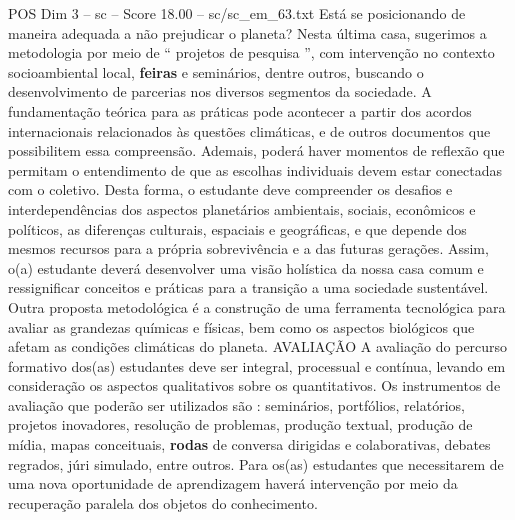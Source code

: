 \begin{textsample}{POS Dim 3 – sc – Score 18.00 – sc/sc\_em\_63.txt}
Está se posicionando de maneira adequada a não prejudicar o planeta?
Nesta última casa, sugerimos a metodologia por meio de “ projetos de pesquisa ”, com intervenção no contexto socioambiental local, \textbf{feiras} e seminários, dentre outros, buscando o desenvolvimento de parcerias nos diversos segmentos da sociedade.
A fundamentação teórica para as práticas pode acontecer a partir dos acordos internacionais relacionados às questões climáticas, e de outros documentos que possibilitem essa compreensão.
Ademais, poderá haver momentos de reflexão que permitam o entendimento de que as escolhas individuais devem estar conectadas com o coletivo.
Desta forma, o estudante deve compreender os desafios e interdependências dos aspectos planetários ambientais, sociais, econômicos e políticos, as diferenças culturais, espaciais e geográficas, e que depende dos mesmos recursos para a própria sobrevivência e a das futuras gerações.
Assim, o(a) estudante deverá desenvolver uma visão holística da nossa casa comum e ressignificar conceitos e práticas para a transição a uma sociedade sustentável.
Outra proposta metodológica é a construção de uma ferramenta tecnológica para avaliar as grandezas químicas e físicas, bem como os aspectos biológicos que afetam as condições climáticas do planeta.
AVALIAÇÃO A avaliação do percurso formativo dos(as) estudantes deve ser integral, processual e contínua, levando em consideração os aspectos qualitativos sobre os quantitativos.
Os instrumentos de avaliação que poderão ser utilizados são : seminários, portfólios, relatórios, projetos inovadores, resolução de problemas, produção textual, produção de mídia, mapas conceituais, \textbf{rodas} de conversa dirigidas e colaborativas, debates regrados, júri simulado, entre outros.
Para os(as) estudantes que necessitarem de uma nova oportunidade de aprendizagem haverá intervenção por meio da recuperação paralela dos objetos do conhecimento.

\end{textsample}
